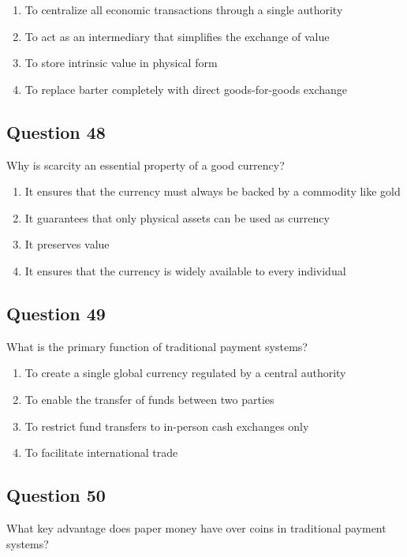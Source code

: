 \documentclass[12pt,a4paper]{article}
\begin{document}
\begin{enumerate}[label=\Alph*., leftmargin=*]
\item To centralize all economic transactions through a single authority
\item To act as an intermediary that simplifies the exchange of value
\item To store intrinsic value in physical form
\item To replace barter completely with direct goods-for-goods exchange
\end{enumerate}

\bigskip


\subsection*{Question 48}
Why is scarcity an essential property of a good currency?

\begin{enumerate}[label=\Alph*., leftmargin=*]
\item It ensures that the currency must always be backed by a commodity like gold
\item It guarantees that only physical assets can be used as currency
\item It preserves value
\item It ensures that the currency is widely available to every individual
\end{enumerate}

\bigskip


\subsection*{Question 49}
What is the primary function of traditional payment systems?

\begin{enumerate}[label=\Alph*., leftmargin=*]
\item To create a single global currency regulated by a central authority
\item To enable the transfer of funds between two parties
\item To restrict fund transfers to in-person cash exchanges only
\item To facilitate international trade
\end{enumerate}

\bigskip


\subsection*{Question 50}
What key advantage does paper money have over coins in traditional payment systems?
\end{document}
